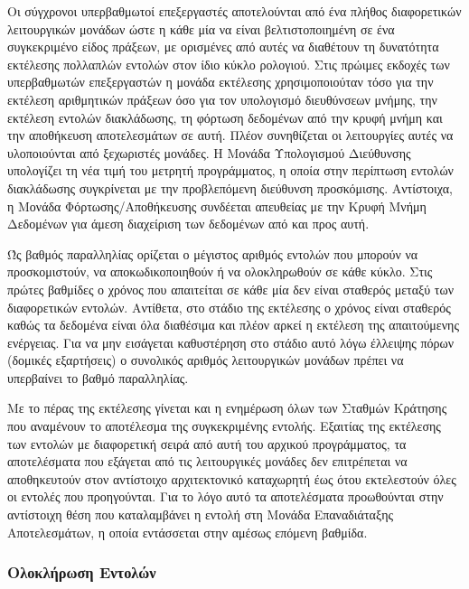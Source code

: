 Οι σύγχρονοι υπερβαθμωτοί επεξεργαστές αποτελούνται από ένα πλήθος διαφορετικών λειτουργικών μονάδων ώστε η κάθε μία να είναι βελτιστοποιημένη σε ένα συγκεκριμένο είδος πράξεων, με ορισμένες από αυτές να διαθέτουν τη δυνατότητα εκτέλεσης πολλαπλών εντολών στον ίδιο κύκλο ρολογιού. Στις πρώιμες εκδοχές των υπερβαθμωτών επεξεργαστών η μονάδα εκτέλεσης χρησιμοποιούταν τόσο για την εκτέλεση αριθμητικών πράξεων όσο για τον υπολογισμό διευθύνσεων μνήμης, την εκτέλεση εντολών διακλάδωσης, τη φόρτωση δεδομένων από την κρυφή μνήμη και την αποθήκευση αποτελεσμάτων σε αυτή. Πλέον συνηθίζεται οι λειτουργίες αυτές να υλοποιούνται από ξεχωριστές μονάδες. Η Μονάδα Υπολογισμού Διεύθυνσης υπολογίζει τη νέα τιμή του μετρητή προγράμματος, η οποία στην περίπτωση εντολών διακλάδωσης συγκρίνεται με την προβλεπόμενη διεύθυνση προσκόμισης. Αντίστοιχα, η Μονάδα Φόρτωσης/Αποθήκευσης συνδέεται απευθείας με την Κρυφή Μνήμη Δεδομένων για άμεση διαχείριση των δεδομένων από και προς αυτή.
\par
Ώς βαθμός παραλληλίας ορίζεται ο μέγιστος αριθμός εντολών που μπορούν να προσκομιστούν, να αποκωδικοποιηθούν ή να ολοκληρωθούν σε κάθε κύκλο. Στις πρώτες βαθμίδες ο χρόνος που απαιτείται σε κάθε μία δεν είναι σταθερός μεταξύ των διαφορετικών εντολών. Αντίθετα, στο στάδιο της εκτέλεσης ο χρόνος είναι σταθερός καθώς τα δεδομένα είναι όλα διαθέσιμα και πλέον αρκεί η εκτέλεση της απαιτούμενης ενέργειας. Για να μην εισάγεται καθυστέρηση στο στάδιο αυτό λόγω έλλειψης πόρων (δομικές εξαρτήσεις) ο συνολικός αριθμός λειτουργικών μονάδων πρέπει να υπερβαίνει το βαθμό παραλληλίας.
\par
Με το πέρας της εκτέλεσης γίνεται και η ενημέρωση όλων των Σταθμών Κράτησης που αναμένουν το αποτέλεσμα της συγκεκριμένης εντολής. Εξαιτίας της εκτέλεσης των εντολών με διαφορετική σειρά από αυτή του αρχικού προγράμματος, τα αποτελέσματα που εξάγεται από τις λειτουργικές μονάδες δεν επιτρέπεται να αποθηκευτούν στον αντίστοιχο αρχιτεκτονικό καταχωρητή έως ότου εκτελεστούν όλες οι εντολές που προηγούνται. Για το λόγο αυτό τα αποτελέσματα προωθούνται στην αντίστοιχη θέση που καταλαμβάνει η εντολή στη Μονάδα Επαναδιάταξης Αποτελεσμάτων, η οποία εντάσσεται στην αμέσως επόμενη βαθμίδα.

\subsubsection*{Ολοκλήρωση Εντολών}
\label{chap2_InstructionCommit}

